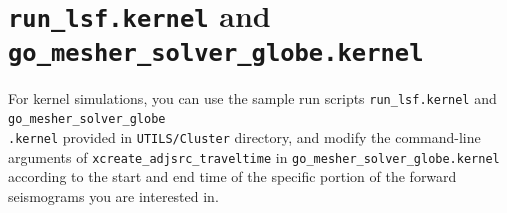 \section{\texttt{run\_lsf.kernel} and \texttt{go\_mesher\_solver\_globe.kernel}}

For kernel simulations, you can use the sample run scripts \texttt{run\_lsf.kernel}
and \texttt{go\_mesher\_solver\_globe}~\\
\texttt{.kernel} provided in \texttt{UTILS/Cluster} directory, and modify
the command-line arguments of \texttt{xcreate\_adjsrc\_traveltime} in
\texttt{go\_mesher\_solver\_globe.kernel} according to the start and end time
of the specific portion of the forward seismograms you are interested
in.




